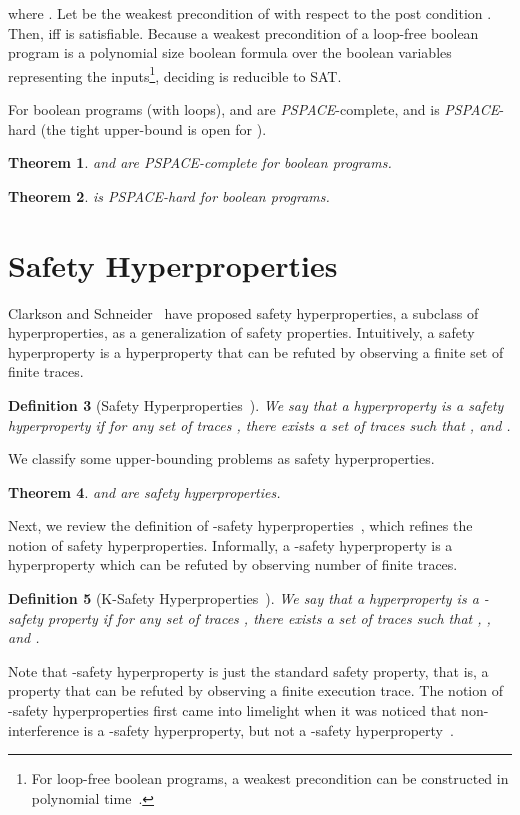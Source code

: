 \documentclass[]{eptcs}
\newtheorem{theorem}{Theorem}[section]
\newtheorem{definition}[theorem]{Definition}
\begin{document}
where .  Let  be the weakest
precondition of  with
respect to the post condition
.  Then,
 iff  is satisfiable.  Because a weakest
precondition of a loop-free boolean program is a polynomial size
boolean formula over the boolean variables representing the
inputs\footnote{For loop-free boolean programs, a weakest precondition
  can be constructed in polynomial
  time~\cite{DBLP:conf/popl/FlanaganS01,DBLP:journals/ipl/Leino05}.},
deciding  is reducible to {\text SAT}.

For boolean programs (with loops),  and
 are {\it PSPACE}-complete, and
 is {\it PSPACE}-hard (the tight upper-bound is
open for ).
\begin{theorem}
\label{thm:lmelgepspace}
   and  are {\it
    PSPACE}-complete for boolean programs.
\end{theorem}

\begin{theorem}
\label{thm:lsepspace}
 is {\it PSPACE}-hard for boolean programs.
\end{theorem}

\section{Safety Hyperproperties}

\label{sec:safety}

Clarkson and Schneider~\cite{DBLP:journals/jcs/ClarksonS10} have
proposed safety hyperproperties, a subclass of hyperproperties, as a
generalization of safety properties.  Intuitively, a safety
hyperproperty is a hyperproperty that can be refuted by observing a
finite set of finite traces.
\begin{definition}[Safety Hyperproperties~\cite{DBLP:journals/jcs/ClarksonS10}] We say that a
hyperproperty  is a safety hyperproperty if for any set of traces
, there exists a set of traces  such that
, and .
\end{definition}

We classify some upper-bounding problems as safety hyperproperties.
\begin{theorem}
\label{thm:umeugesp}
   and  are safety hyperproperties.
\end{theorem}

Next, we review the definition of -safety
hyperproperties~\cite{DBLP:journals/jcs/ClarksonS10}, which refines
the notion of safety hyperproperties.  Informally, a -safety
hyperproperty is a hyperproperty which can be refuted by observing 
number of finite traces.
\begin{definition}[K-Safety
  Hyperproperties~\cite{DBLP:journals/jcs/ClarksonS10}]
  We say that a hyperproperty  is a -safety property if for any
  set of traces , there exists a set of traces  such that , , and .
\end{definition}
Note that -safety hyperproperty is just the standard safety
property, that is, a property that can be refuted by observing a
finite execution trace.  The notion of -safety hyperproperties
first came into limelight when it was noticed that non-interference
is a -safety hyperproperty, but not a -safety
hyperproperty~\cite{terauchi:sas05}.
\end{document}

